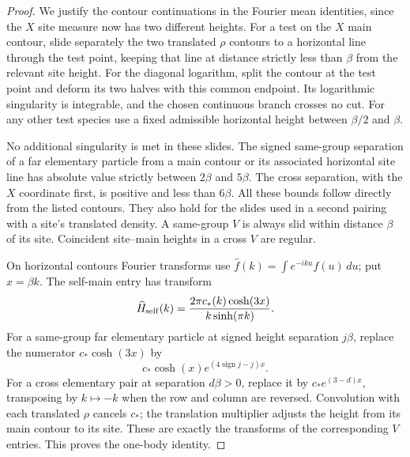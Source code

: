 \begin{proof}
We justify the contour continuations in the Fourier mean
identities, since the \(X\) site measure now has two different
heights.  For a test on the \(X\) main contour, slide separately the
two translated \(\rho\) contours to a horizontal line through the
test point, keeping that line at distance strictly less than
\(\beta\) from the relevant site height.  For the diagonal
logarithm, split the contour at the test point and deform its two
halves with this common endpoint.  Its logarithmic singularity is
integrable, and the chosen continuous branch crosses no cut.
For any other test species use a fixed admissible horizontal
height between \(\beta/2\) and \(\beta\).

No additional singularity is met in these slides.
The signed same-group separation of a far elementary particle from
a main contour or its associated horizontal site line has absolute
value strictly between \(2\beta\) and \(5\beta\).
The cross separation, with the \(X\) coordinate first, is positive
and less than \(6\beta\).
All these bounds follow directly from the listed contours.
They also hold for the slides used in a second pairing with a
site's translated density.  A same-group \(V\) is always slid
within distance \(\beta\) of its site.  Coincident site--main
heights in a cross \(V\) are regular.

On horizontal contours Fourier transforms use
\(\widehat f(k)=\int e^{-iku}f(u)\,du\); put \(x=\beta k\).
The self-main entry has transform
\[
 \widehat H_{\rm self}(k)
 =\frac{2\pi c_*(k)\cosh(3x)}{k\sinh(\pi k)}.
\]
For a same-group far elementary particle at signed height
separation \(j\beta\), replace the numerator
\(c_*\cosh(3x)\) by
\[
 c_*\cosh(x)e^{(4\operatorname{sign}j-j)x}.
\]
For a cross elementary pair at separation \(d\beta>0\), replace it
by \(c_*e^{(3-d)x}\), transposing by \(k\mapsto-k\) when the row
and column are reversed.
Convolution with each translated \(\rho\) cancels \(c_*\);
the translation multiplier adjusts the height from its main
contour to its site.  These are exactly the transforms of the
corresponding \(V\) entries.  This proves the one-body identity.


\end{proof}
